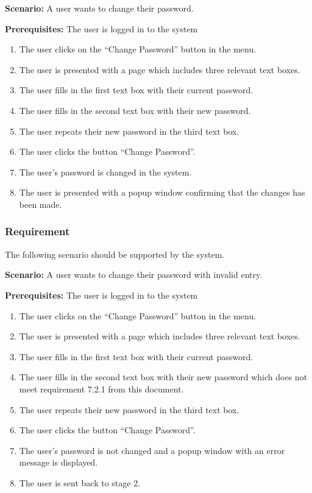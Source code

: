 \documentclass{article}
\begin{document}
\textbf{Scenario:} A user wants to change their password.

\textbf{Prerequisites:} The user is logged in to the system

\begin{enumerate}
    \item The user clicks on the “Change Password” button in the menu.
    \item The user is presented with a page which includes three relevant text boxes.
    \item The user fills in the first text box with their current password.
    \item The user fills in the second text box with their new password.
    \item The user repeats their new password in the third text box.
    \item The user clicks the button “Change Password”.
    \item The user's password is changed in the system.
    \item The user is presented with a popup window confirming that the changes has been made.
\end{enumerate}



\subsubsection{Requirement}
The following scenario should be supported by the system.

\textbf{Scenario:} A user wants to change their password with invalid entry.

\textbf{Prerequisites:} The user is logged in to the system

\begin{enumerate}
    \item The user clicks on the “Change Password” button in the menu.
    \item The user is presented with a page which includes three relevant text boxes.
    \item The user fills in the first text box with their current password.
    \item The user fills in the second text box with their new password which does not meet requirement 7.2.1 from this document.
    \item The user repeats their new password in the third text box.
    \item The user clicks the button “Change Password”.
    \item The user's password is not changed and a popup window with an error message is displayed.
    \item The user is sent back to stage 2.
\end{enumerate}
\end{document}
